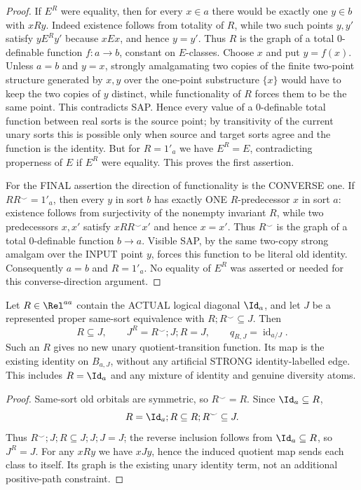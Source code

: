 \begin{proof}
If \(E^R\) were equality, then for every \(x\in a\) there would be exactly
one \(y\in b\) with \(xRy\).  Indeed existence follows from totality of
\(R\), while two such points \(y,y'\) satisfy
\(yE^Ry'\) because \(xEx\), and hence \(y=y'\).  Thus \(R\) is the graph of
a total \(0\)-definable function \(f:a\to b\), constant on \(E\)-classes.
Choose \(x\) and put \(y=f(x)\).  Unless \(a=b\) and \(y=x\), strongly
amalgamating two copies of the finite two-point structure generated by
\(x,y\) over the one-point substructure \(\{x\}\) would have to keep the two
copies of \(y\) distinct, while functionality of \(R\) forces them to be the
same point.  This contradicts SAP.  Hence every value of a \(0\)-definable
total function between real sorts is the source point; by transitivity of the
current unary sorts this is possible only when source and target sorts agree
and the function is the identity.  But for
\(R=1'_a\) we have \(E^R=E\), contradicting properness of \(E\) if
\(E^R\) were equality.  This proves the first assertion.

For the FINAL assertion the direction of functionality is
the CONVERSE one. If \(RR^\smile=1'_a\),
then every \(y\) in sort \(b\) has exactly ONE
\(R\)-predecessor \(x\) in sort \(a\):
existence follows from surjectivity of
the nonempty invariant \(R\), while
two predecessors \(x,x'\) satisfy
\(xRR^\smile x'\) and hence \(x=x'\).
Thus \(R^\smile\) is the graph of
a total \(0\)-definable function \(b\to a\).
Visible SAP, by the same two-copy
strong amalgam over the INPUT point
\(y\), forces this function to be
literal old identity. Consequently
\(a=b\) and \(R=1'_a\).
No equality of \(E^R\) was asserted
or needed for this converse-direction argument.
\end{proof}

\begin{lemma}
\label{lem:typed-identity-transport-redundant}
Let \(R\in\Rel^{aa}\) contain the ACTUAL
logical diagonal \(\Id_a\), and let
\(J\) be a represented proper same-sort
equivalence with \(R;R^\smile\subseteq J\).
Then
\[
 R\subseteq J,\qquad
 J^R=R^\smile;J;R=J,\qquad
 q_{R,J}=\operatorname{id}_{a/J}.
\tag{QT-Id}\label{eq:typed-identity-transport}
\]
Such an \(R\) gives no new unary
quotient-transition function. Its map
is the existing identity on
\(B_{a,J}\), without any artificial
STRONG identity-labelled edge.
This includes \(R=\Id_a\)
and any mixture of identity and
genuine diversity atoms.
\end{lemma}
\begin{proof}
Same-sort old orbitals are symmetric,
so \(R^\smile=R\). Since
\(\Id_a\subseteq R\),
\[
 R=\Id_a;R\subseteq R;R^\smile
                      \subseteq J.
\]
Thus \(R^\smile;J;R\subseteq
J;J;J=J\); the reverse inclusion
follows from \(\Id_a\subseteq R\),
so \(J^R=J\). For any \(xRy\)
we have \(xJy\), hence the
induced quotient map sends
each class to itself. Its
graph is the existing unary
identity term, not an additional
positive-path constraint.
\end{proof}

